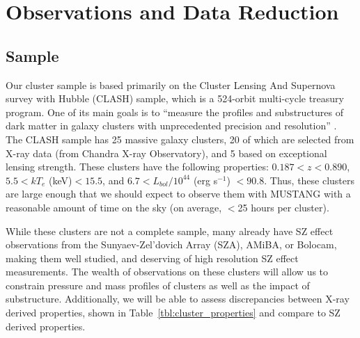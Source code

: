 \documentclass[iop,numberedappendix,apj]{emulateapj}
\begin{document}
\section{Observations and Data Reduction}
\label{sec:obs}

\subsection{Sample}

Our cluster sample is based primarily on the Cluster Lensing And Supernova survey with Hubble (CLASH) sample, which is a
524-orbit multi-cycle treasury program. One of its main goals is to ``measure the profiles and substructures of dark matter 
in galaxy clusters with unprecedented precision and resolution'' \citep{postman2012}. The CLASH sample has 25 massive galaxy 
clusters, 20 of which are selected from X-ray data (from Chandra X-ray Observatory), and 5 based on exceptional lensing strength. 
These clusters have the following properties: $0.187 < z < 0.890$, $5.5 < k T_e$ (keV)$ < 15.5$, and $6.7 < L_{bol} / 10^{44} $ 
(erg s$^{-1}$) $<90.8$. Thus, these clusters are large enough that we should expect to observe them with MUSTANG with a reasonable 
amount of time on the sky (on average, $<$25 hours per cluster).

While these clusters are not a complete sample, many already have SZ effect observations from the Sunyaev-Zel'dovich 
Array (SZA), AMiBA, or Bolocam, making them well studied, and deserving of high resolution SZ effect measurements. 
The wealth of observations on these clusters will allow us to constrain pressure and 
mass profiles of clusters as well as the impact of substructure. Additionally, we will be able to assess discrepancies
between X-ray derived properties, shown in Table~\ref{tbl:cluster_properties} 
and compare to SZ derived properties. 
\end{document}
